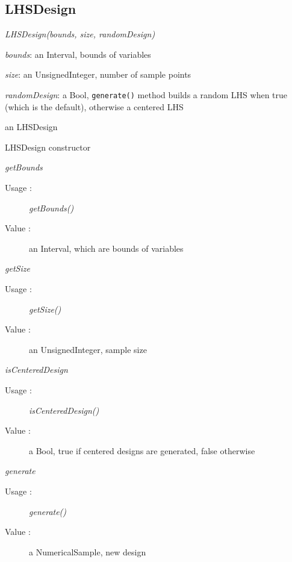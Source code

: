\subsection{LHSDesign}
\begin{description}

\item[Usage:] \rule{0pt}{1em}
  \begin{description}
  \item \textit{LHSDesign(bounds, size, randomDesign)}
  \end{description}

\item[Arguments:]  \rule{0pt}{1em}
  \begin{description}
  \item \textit{bounds}: an Interval, bounds of variables
  \item \textit{size}: an UnsignedInteger, number of sample points
  \item \textit{randomDesign}: a Bool, \texttt{generate()} method builds a random LHS when true (which is the default), otherwise a centered LHS
  \end{description}

\item[Value :] an LHSDesign

\item[Details :]  \rule{0pt}{1em}
  \begin{description}
  \item LHSDesign constructor
  \end{description}

\item \textit{getBounds}
  \begin{description}
  \item[Usage :] \textit{getBounds()}
  \item[Value :] an Interval, which are bounds of variables
  \end{description}

\item \textit{getSize}
  \begin{description}
  \item[Usage :] \textit{getSize()}
  \item[Value :] an UnsignedInteger, sample size
  \end{description}

\item \textit{isCenteredDesign}
  \begin{description}
  \item[Usage :] \textit{isCenteredDesign()}
  \item[Value :] a Bool, true if centered designs are generated, false otherwise
  \end{description}

\item \textit{generate}
  \begin{description}
  \item[Usage :] \textit{generate()}
  \item[Value :] a NumericalSample, new design
  \end{description}

\end{description}

